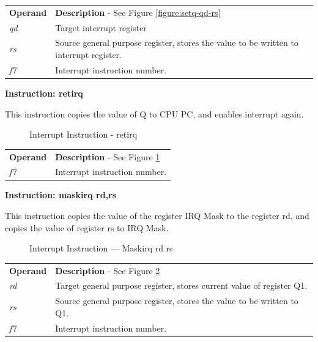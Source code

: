 \documentclass[main\_\_EN.tex]{subfiles}
\begin{document}
\begin{tabular}{ l l }
\textbf{Operand} & \textbf{Description} - See Figure \ref{figure:setq-qd-rs} \\
\textit{qd} & Target interrupt register \\
\textit{rs} & Source general purpose register, stores the value to be written to interrupt register. \\
\textit{f7} &  Interrupt instruction number. \\
\end{tabular}

\textcolor{istcolor}{\textbf{Instruction: retirq}}

This instruction copies the value of Q to CPU PC, and enables interrupt again.

%
%
%
%
%
%
\begin{figure}[H]
    \centering
    \caption{Interrupt Instruction - retirq }
    \label{figure:retirq}
\end{figure}

\vspace{-2em}
\begin{tabular}{ l l }
\textbf{Operand} & \textbf{Description} - See Figure \ref{figure:retirq} \\
\textit{f7} & Interrupt instruction number. \\
\end{tabular}

\vspace{1em}
\textcolor{istcolor}{\textbf{Instruction: maskirq rd,rs}}

This instruction copies the value of the register IRQ Mask to the register rd, and copies the value of register rs to IRQ Mask.

%
%
%
%
%
%
\begin{figure}[H]
    \centering
    \caption{Interrupt Instruction — Maskirq rd rs  }
    \label{figure:Maskirq-rd-rs}
\end{figure}

\vspace{-2em}
\begin{tabular}{ l l }
\textbf{Operand} & \textbf{Description} - See Figure \ref{figure:Maskirq-rd-rs} \\
\textit{rd} & Target general purpose register, stores current value of register Q1.\\
\textit{rs} & Source general purpose register, stores the value to be written to Q1. \\
\textit{f7} & Interrupt instruction number. \\
\end{tabular}
\end{document}
